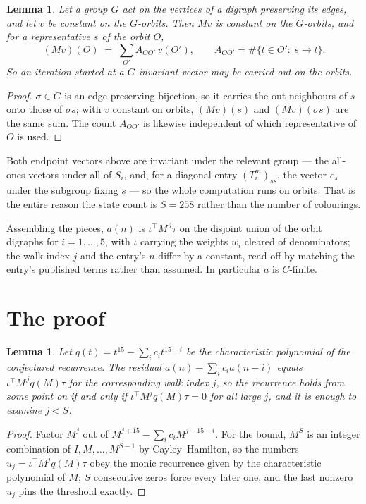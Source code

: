 \documentclass[11pt,a4paper]{article}
\theoremstyle{plain}
\newtheorem{lemma}[theorem]{Lemma}
\theoremstyle{definition}
\begin{document}
\begin{lemma}\label{lem:lump}
Let a group $G$ act on the vertices of a digraph preserving its edges, and let $v$ be constant
on the $G$-orbits. Then $Mv$ is constant on the $G$-orbits, and for a representative $s$ of
the orbit $O$,
\[
(Mv)(O)\;=\;\sum_{O'}A_{OO'}\,v(O'),\qquad
A_{OO'}=\#\{t\in O':\ s\to t\} .
\]
So an iteration started at a $G$-invariant vector may be carried out on the orbits.
\end{lemma}

\begin{proof}
$\sigma\in G$ is an edge-preserving bijection, so it carries the out-neighbours of $s$ onto
those of $\sigma s$; with $v$ constant on orbits, $(Mv)(s)$ and $(Mv)(\sigma s)$ are the same
sum. The count $A_{OO'}$ is likewise independent of which representative of $O$ is used.
\end{proof}

Both endpoint vectors above are invariant under the relevant group --- the all-ones vectors
under all of $S_i$, and, for a diagonal entry $(T_i^m)_{ss}$, the vector $e_s$ under the
subgroup fixing $s$ --- so the whole computation runs on orbits. That is the entire reason the
state count is $S=258$ rather than the number of colourings.

Assembling the pieces, $a(n)$ is $\iota^{\!\top}M^{\,j}\tau$ on the disjoint union of the
orbit digraphs for $i=1,\dots,5$, with $\iota$ carrying the weights $w_i$ cleared of
denominators; the walk index $j$ and the entry's $n$ differ by a constant, read off by
matching the entry's published terms rather than assumed. In particular $a$ is $C$-finite.

\section{The proof}

\begin{lemma}\label{lem:crit}
Let $q(t)=t^{15}-\sum_i c_it^{15-i}$ be the characteristic polynomial of the
conjectured recurrence. The residual $a(n)-\sum_ic_ia(n-i)$ equals
$\iota^{\!\top}M^{\,j}q(M)\tau$ for the corresponding walk index $j$, so the recurrence
holds from some point on if and only if $\iota^{\!\top}M^{j}q(M)\tau=0$ for all large $j$,
and it is enough to examine $j<S$.
\end{lemma}

\begin{proof}
Factor $M^{j}$ out of $M^{j+15}-\sum_ic_iM^{j+15-i}$. For the bound, $M^{S}$
is an integer combination of $I,M,\dots,M^{S-1}$ by Cayley--Hamilton, so the numbers
$u_j=\iota^{\!\top}M^{j}q(M)\tau$ obey the monic recurrence given by the characteristic
polynomial of $M$; $S$ consecutive zeros force every later one, and the last nonzero $u_j$
pins the threshold exactly.
\end{proof}
\end{document}
